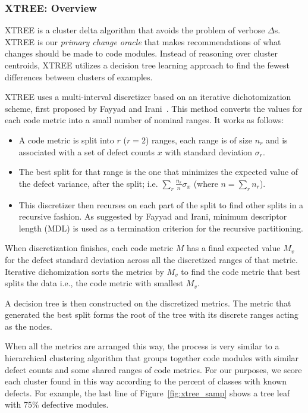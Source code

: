 \documentclass[twocolumn,5p]{elsarticle}
\newcommand{\fig}[1]{Figure~\ref{fig:#1}}
\theoremstyle{break}
\begin{document}
	\subsubsection{XTREE: Overview}
	
	XTREE  is a cluster delta algorithm
	that avoids the problem of verbose $\Delta$s.
	XTREE is our {\em primary change oracle} that makes recommendations 
	of what changes should be made to code modules.
	Instead of reasoning over cluster centroids,
	XTREE utilizes a decision tree learning approach
	to find the fewest differences between clusters of examples.
	
	
	XTREE uses a multi-interval discretizer based on an iterative dichotomization scheme, first proposed by Fayyad and Irani~\cite{fi}. This method converts the values for each code metric into a small number of nominal ranges. It works as follows:
	\begin{itemize}
		\item A code metric is split into $r$ ($r=2$) ranges, each range is of
		size $n_r$ and is associated with a set of defect counts $x$ with standard deviation
		$\sigma_r$. 
		\item The best split for that range is the one that minimizes the expected value of the
		defect variance, after the split; i.e. $\sum_r\frac{n_r}{n}\sigma_x$ (where $n=\sum_r n_r$). 
		\item This discretizer then recurses on each part of the split to find other splits in a recursive fashion. As suggested by Fayyad and Irani, minimum descriptor length (MDL) is used as a termination criterion for the recursive partitioning.
	\end{itemize}
	
	When discretization finishes, each code metric $M$ has a 
	final expected value $M_v$ for the defect standard deviation 
	across all the discretized ranges of that metric.
	Iterative dichomization sorts the metrics by $M_v$
	to find the code metric that best splits the data i.e., the code metric with smallest $M_v$. 
	
	A decision tree is then constructed on the discretized metrics. The metric that generated the best split forms the root of the tree with its discrete ranges acting as the nodes. 
	
	When all the metrics are arranged this way, the process is very similar to a hierarchical clustering algorithm that groups together code modules with similar defect counts and some shared ranges of code metrics.
	For our purposes, we score each cluster found in this way according
	to the percent of classes with known defects. For example, the last line of \fig{xtree_samp} shows a tree leaf with 75\%
	defective modules.
	
\end{document}
